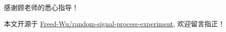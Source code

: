 \documentclass[../main]{subfiles}
\begin{document}
\begin{acknowledgement}

  感谢顾老师的悉心指导！

  本文开源于
  \href{https://github.com/Freed-Wu/random-signal-process-experiment}{Freed-Wu/random-signal-process-experiment},
  欢迎留言指正！
\end{acknowledgement}
\end{document}
